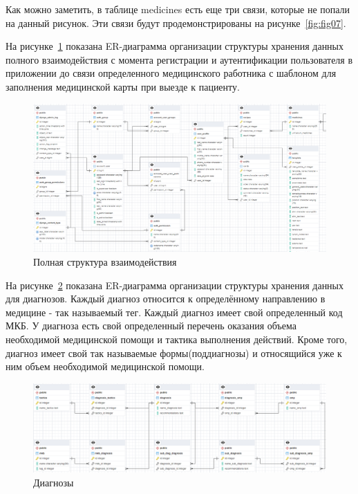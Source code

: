 Как можно заметить, в таблице medicines есть еще три связи, которые не попали на данный рисунок. Эти связи будут продемонстрированы на рисунке~\ref{fig:fig07}.

На рисунке~\ref{fig:fig04} показана ER-диаграмма организации структуры хранения данных полного взаимодействия с момента регистрации и аутентификации пользователя в приложении до связи определенного медицинского работника с шаблоном для заполнения медицинской карты при выезде к пациенту.

\begin{figure}
  \includegraphics[scale=0.418]{inc/django_user_profile}
  \caption{Полная структура взаимодействия}
  \label{fig:fig04}
\end{figure}

На рисунке~\ref{fig:fig05} показана ER-диаграмма организации структуры хранения данных для диагнозов. Каждый диагноз относится к определённому направлению в медицине - так называемый тег. Каждый диагноз имеет свой определенный код МКБ. У диагноза есть свой определенный перечень оказания объема необходимой медицинской помощи и тактика выполнения действий. Кроме того, диагноз имеет свой так называемые формы(поддиагнозы) и относящийся уже к ним объем необходимой медицинской помощи.

\begin{figure}
  \includegraphics[scale=0.354]{inc/diagnosis}
  \caption{Диагнозы}
  \label{fig:fig05}
\end{figure}

